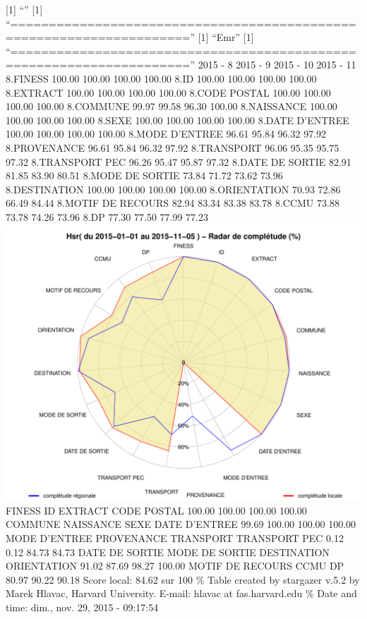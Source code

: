 \documentclass[]{article}
\begin{document}
{[}1{]} ``'' {[}1{]}
``=====================================================================''
{[}1{]} ``Emr'' {[}1{]}
``=====================================================================''
2015 - 8 2015 - 9 2015 - 10 2015 - 11 8.FINESS 100.00 100.00 100.00
100.00 8.ID 100.00 100.00 100.00 100.00 8.EXTRACT 100.00 100.00 100.00
100.00 8.CODE POSTAL 100.00 100.00 100.00 100.00 8.COMMUNE 99.97 99.58
96.30 100.00 8.NAISSANCE 100.00 100.00 100.00 100.00 8.SEXE 100.00
100.00 100.00 100.00 8.DATE D'ENTREE 100.00 100.00 100.00 100.00 8.MODE
D'ENTREE 96.61 95.84 96.32 97.92 8.PROVENANCE 96.61 95.84 96.32 97.92
8.TRANSPORT 96.06 95.35 95.75 97.32 8.TRANSPORT PEC 96.26 95.47 95.87
97.32 8.DATE DE SORTIE 82.91 81.85 83.90 80.51 8.MODE DE SORTIE 73.84
71.72 73.62 73.96 8.DESTINATION 100.00 100.00 100.00 100.00
8.ORIENTATION 70.93 72.86 66.49 84.44 8.MOTIF DE RECOURS 82.94 83.34
83.38 83.78 8.CCMU 73.88 73.78 74.26 73.96 8.DP 77.30 77.50 77.99 77.23
\includegraphics{completude_files/figure-latex/finess-18.pdf} FINESS ID
EXTRACT CODE POSTAL 100.00 100.00 100.00 100.00 COMMUNE NAISSANCE SEXE
DATE D'ENTREE 99.69 100.00 100.00 100.00 MODE D'ENTREE PROVENANCE
TRANSPORT TRANSPORT PEC 0.12 0.12 84.73 84.73 DATE DE SORTIE MODE DE
SORTIE DESTINATION ORIENTATION 91.02 87.69 98.27 100.00 MOTIF DE RECOURS
CCMU DP 80.97 90.22 90.18 Score local: 84.62 sur 100 \% Table created by
stargazer v.5.2 by Marek Hlavac, Harvard University. E-mail: hlavac at
fas.harvard.edu \% Date and time: dim., nov. 29, 2015 - 09:17:54
\end{document}
